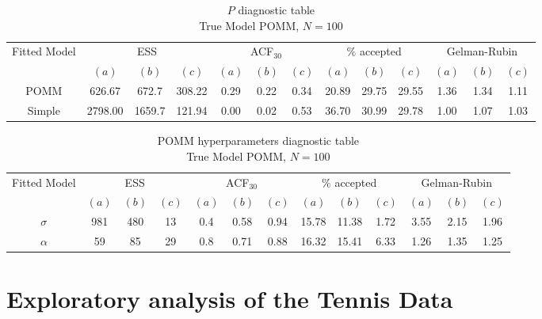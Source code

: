 \documentclass[11pt]{amsart}
\begin{document}
\begin{table}[htbp]
\centering
\caption*{
{\large $P$ diagnostic table} \\ 
{\small True Model POMM, $N=100$}
} 
\begin{tabular}{ccccccccccccc}
\toprule
\multirow{2}{*}{Fitted Model} & \multicolumn{3}{c}{ESS} & \multicolumn{3}{c}{
ACF$_{30}$} & \multicolumn{3}{c}{$\%$ accepted} & \multicolumn{3}{c}{Gelman-Rubin}\\
\cmidrule(lr){2-4} \cmidrule(lr){5-7} \cmidrule(lr){8-10} \cmidrule(lr){11-13} 
& $(a)$ & $(b)$ & $(c)$ & $(a)$ & $(b)$ & $(c)$ & $(a)$ & $(b)$ & $(c)$ & $(a)$ & $(b)$ & $(c)$ \\
\midrule
POMM &626.67 & 672.7 & 308.22 & 0.29 & 0.22 & 0.34 & 20.89 & 29.75 & 29.55 & 1.36 & 1.34 & 1.11    \\
Simple &2798.00 & 1659.7 & 121.94 & 0.00 & 0.02 & 0.53 & 36.70 & 30.99 & 29.78 & 1.00 & 1.07 & 1.03    \\
\bottomrule
\end{tabular}
\label{table:P_diagnostic_POMM}
\end{table}




\begin{table}[htbp]
\centering
\caption*{
{\large POMM hyperparameters diagnostic table} \\ 
{\small True Model POMM, $N=100$}
} 
\begin{tabular}{ccccccccccccc}
\toprule
\multirow{2}{*}{Fitted Model} & \multicolumn{3}{c}{ESS} & \multicolumn{3}{c}{
ACF$_{30}$} & \multicolumn{3}{c}{$\%$ accepted} & \multicolumn{3}{c}{Gelman-Rubin}\\
\cmidrule(lr){2-4} \cmidrule(lr){5-7} \cmidrule(lr){8-10} \cmidrule(lr){11-13} 
& $(a)$ & $(b)$ & $(c)$ & $(a)$ & $(b)$ & $(c)$ & $(a)$ & $(b)$ & $(c)$ & $(a)$ & $(b)$ & $(c)$ \\
\midrule
$\sigma$ &981 & 480 & 13 & 0.4 & 0.58 & 0.94 & 15.78 & 11.38 & 1.72 & 3.55 & 2.15 & 1.96  \\
$\alpha$ &59 & 85 & 29 & 0.8 & 0.71 & 0.88 & 16.32 & 15.41 & 6.33 & 1.26 & 1.35 & 1.25    \\
\bottomrule
\end{tabular}
\label{table:simulations_from_simple}
\end{table}






\clearpage

\section{Exploratory analysis of the Tennis Data}
\end{document}
